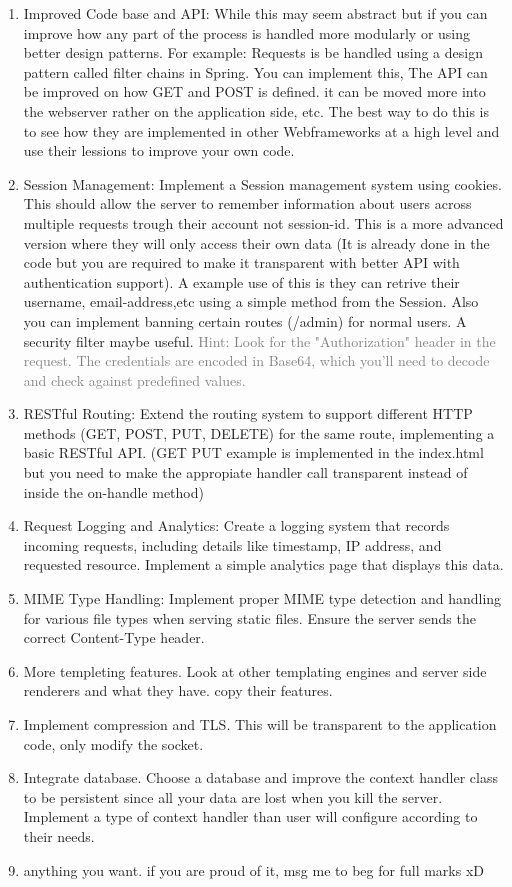\documentclass{article}
\begin{document}
\begin{enumerate}[label=(\alph*)]
    \item Improved Code base and API: While this may seem abstract but if you can improve how any part of the process is handled more modularly or using better design patterns. For example: Requests is be handled using a design pattern called filter chains in Spring. You can implement this, The API can be improved on how GET and POST is defined. it can be moved more into the webserver rather on the application side, etc.  The best way to do this is to see how they are implemented in other Webframeworks at a high level and use their lessions to improve your own code.
    \item Session Management: Implement a Session management system using cookies. This should allow the server to remember information about users across multiple requests trough their account not session-id. This is a more advanced version where they will only access their own data (It is already done in the code but you are required to make it transparent with better API with authentication support). A example use of this is they can retrive their username, email-address,etc using a simple method from the Session. Also you can implement banning certain routes (/admin) for normal users. A security filter maybe useful.
    \textcolor{gray}{Hint: Look for the "Authorization" header in the request. The credentials are encoded in Base64, which you'll need to decode and check against predefined values.}
    \item RESTful Routing: Extend the routing system to support different HTTP methods (GET, POST, PUT, DELETE) for the same route, implementing a basic RESTful API. (GET PUT example is implemented in the index.html but you need to make the appropiate handler call transparent instead of inside the on-handle method) 
    \item Request Logging and Analytics: Create a logging system that records incoming requests, including details like timestamp, IP address, and requested resource. Implement a simple analytics page that displays this data.
    \item MIME Type Handling: Implement proper MIME type detection and handling for various file types when serving static files. Ensure the server sends the correct Content-Type header.
    \item More templeting features. Look at other templating engines and server side renderers and what they have. copy their features.
    \item Implement compression and TLS. This will be transparent to the application code, only modify the socket.
    \item Integrate database. Choose a database and improve the context handler class to be persistent since all your data are lost when you kill the server. Implement a type of context handler than user will configure according to their needs.
    \item anything you want. if you are proud of it, msg me to beg for full marks xD
\end{enumerate}
\end{document}
